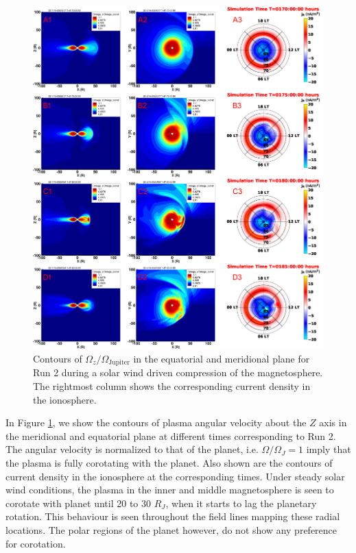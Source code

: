 \begin{figure}
    \centering
    \includegraphics[width=\textwidth]{images3/combined_corotation_change.png}
    \caption{Contours of $\Omega_z/\Omega_\text{Jupiter}$ in the equatorial and meridional plane for Run 2 during a solar wind driven compression of the magnetosphere. The rightmost column shows the corresponding current density in the ionosphere.}
    \label{fig:combined-corotation-change}
\end{figure}

In Figure \ref{fig:combined-corotation-change}, we show the contours of plasma angular velocity about the $Z$ axis in the meridional and equatorial plane at different times corresponding to Run 2. The angular velocity is normalized to that of the planet, i.e. $\Omega/\Omega_J=1$ imply that the plasma is fully corotating with the planet. Also shown are the contours of current density in the ionosphere at the corresponding times. Under steady solar wind conditions, the plasma in the inner and middle magnetosphere is seen to corotate with planet until 20 to 30 $R_J$, when it starts to lag the planetary rotation. This behaviour is seen throughout the field lines mapping these radial locations. The polar regions of the planet however, do not show any preference for corotation.

